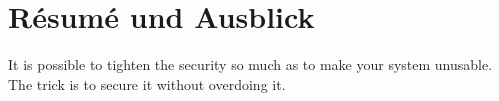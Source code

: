 \section{Résumé und Ausblick}
\kant[4-10]

\begin{quoting}
	\centering
	It is possible to tighten the security so much as to make your system unusable. The trick is to secure it without overdoing it.\cite{eample}
\end{quoting}
